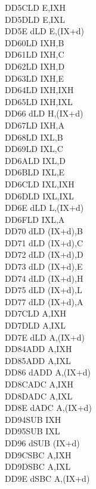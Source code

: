 \documentclass[12pt,twoside,openright,a4paper]{book}
\begin{document}
\begin{multicols}{3}
{\begin{tabbing}
	DD5C\>LD E,IXH\UNDOC\\
	DD5D\>LD E,IXL\UNDOC\\
	DD5E d\>LD E,(IX+d)\\
	DD60\>LD IXH,B\UNDOC\\
	DD61\>LD IXH,C\UNDOC\\
	DD62\>LD IXH,D\UNDOC\\
	DD63\>LD IXH,E\UNDOC\\
	DD64\>LD IXH,IXH\UNDOC\\
	DD65\>LD IXH,IXL\UNDOC\\
	DD66 d\>LD H,(IX+d)\\
	DD67\>LD IXH,A\UNDOC\\
	DD68\>LD IXL,B\UNDOC\\
	DD69\>LD IXL,C\UNDOC\\
	DD6A\>LD IXL,D\UNDOC\\
	DD6B\>LD IXL,E\UNDOC\\
	DD6C\>LD IXL,IXH\UNDOC\\
	DD6D\>LD IXL,IXL\UNDOC\\
	DD6E d\>LD L,(IX+d)\\
	DD6F\>LD IXL,A\UNDOC\\
	DD70 d\>LD (IX+d),B\\
	DD71 d\>LD (IX+d),C\\
	DD72 d\>LD (IX+d),D\\
	DD73 d\>LD (IX+d),E\\
	DD74 d\>LD (IX+d),H\\
	DD75 d\>LD (IX+d),L\\
	DD77 d\>LD (IX+d),A\\
	DD7C\>LD A,IXH\UNDOC\\
	DD7D\>LD A,IXL\UNDOC\\
	DD7E d\>LD A,(IX+d)\\
	DD84\>ADD A,IXH\UNDOC\\
	DD85\>ADD A,IXL\UNDOC\\
	DD86 d\>ADD A,(IX+d)\\
	DD8C\>ADC A,IXH\UNDOC\\
	DD8D\>ADC A,IXL\UNDOC\\
	DD8E d\>ADC A,(IX+d)\\
	DD94\>SUB IXH\UNDOC\\
	DD95\>SUB IXL\UNDOC\\
	DD96 d\>SUB (IX+d)\\
	DD9C\>SBC A,IXH\UNDOC\\
	DD9D\>SBC A,IXL\UNDOC\\
	DD9E d\>SBC A,(IX+d)\\

\end{tabbing}}
\end{multicols}
\end{document}
